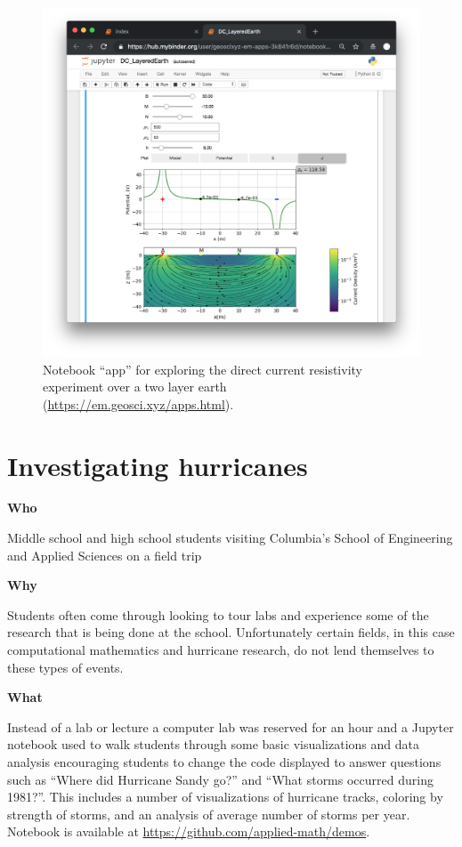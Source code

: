 \documentclass[]{book}
\begin{document}
\begin{figure}
\centering
\includegraphics{images/DC-layered-earth-app.png}
\caption{Notebook ``app'' for exploring the direct current resistivity experiment over a
two layer earth
(\url{https://em.geosci.xyz/apps.html}).}
\end{figure}

\hypertarget{investigating-hurricanes}{%
\section{Investigating hurricanes}\label{investigating-hurricanes}}

\textbf{Who}

Middle school and high school students visiting Columbia's School of
Engineering and Applied Sciences on a field trip

\textbf{Why}

Students often come through looking to tour labs and experience some
of the research that is being done at the school. Unfortunately
certain fields, in this case computational mathematics and hurricane
research, do not lend themselves to these types of events.

\textbf{What}

Instead of a lab or lecture a computer lab was reserved for an hour
and a Jupyter notebook used to walk students through some basic
visualizations and data analysis encouraging students to change the
code displayed to answer questions such as ``Where did Hurricane Sandy
go?'' and ``What storms occurred during 1981?''. This includes a number
of visualizations of hurricane tracks, coloring by strength of storms,
and an analysis of average number of storms per year. Notebook is
available at \url{https://github.com/applied-math/demos}.
\end{document}
